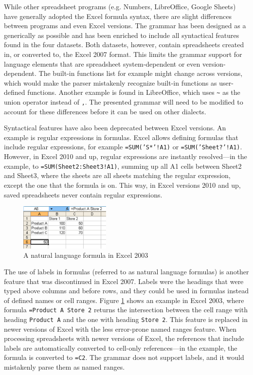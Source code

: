 \documentclass[times]{smrauth}
\begin{document}
While other spreadsheet programs (e.g. Numbers, LibreOffice, Google Sheets) have generally adopted the Excel formula syntax, there are slight differences between programs and even Excel versions.
The grammar has been designed as a generically as possible and has been enriched to include all syntactical features found in the four datasets.
Both datasets, however, contain spreadsheets created in, or converted to, the Excel 2007 format.
This limits the grammar support for language elements that are spreadsheet system-dependent or even version-dependent.
The built-in functions list for example might change across versions, which would make the parser mistakenly recognize built-in functions as user-defined functions.
Another example is found in LibreOffice, which uses \texttt{\~} as the union operator instead of \texttt{,}.
The presented grammar will need to be modified to account for these differences before it can be used on other dialects.

Syntactical features have also been deprecated between Excel versions.
An example is regular expressions in formulas.
Excel allows defining formulas that include regular expressions, for example \texttt{=SUM('S*'!A1)} or \texttt{=SUM('Sheet?'!A1)}.
However, in Excel 2010 and up, regular expressions are instantly resolved---in the example, to  \texttt{=SUM(Sheet2:Sheet3!A1)}, summing up all A1 cells between Sheet2 and Sheet3, where the sheets are all sheets matching the regular expression, except the one that the formula is on.
This way, in Excel versions 2010 and up, saved spreadsheets never contain regular expressions.
\begin{figure}
	\centering
	\includegraphics[width=0.4\textwidth]{img/labels}
	\caption{A natural language formula in Excel 2003}
	\label{fig:labels}
\end{figure}

The use of labels in formulas (referred to as natural language formulas) is another feature that was discontinued in Excel 2007.
Labels were the headings that were typed above columns and before rows, and they could be used in formulas instead of defined names or cell ranges.
Figure \ref{fig:labels} shows an example in Excel 2003, where formula \texttt{=Product A Store 2} returns the intersection between the cell range with heading \texttt{Product A} and the one with heading \texttt{Store 2}.
This feature is replaced in newer versions of Excel with the less error-prone named ranges feature.
When processing spreadsheets with newer versions of Excel, the references that include labels are automatically converted to cell-only references---in the example, the formula is converted to \texttt{=C2}.
The grammar does not support labels, and it would mistakenly parse them as named ranges.
\end{document}
